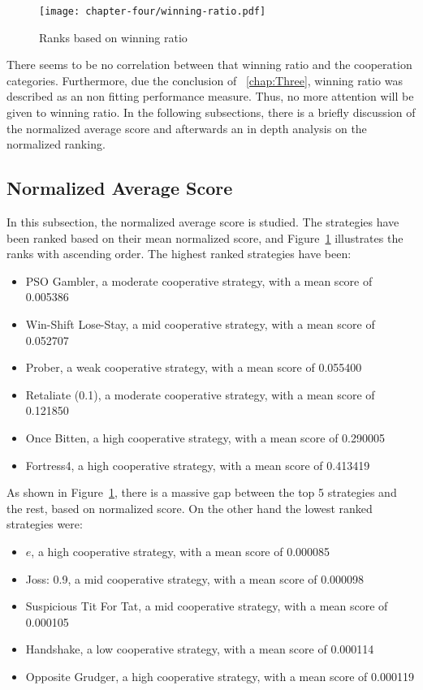 \begin{figure}[H]
	\texttt{[image: chapter-four/winning-ratio.pdf]}
	\caption{Ranks based on winning ratio}
	\label{fig:wining-second-gen}
\end{figure}

There seems to be no correlation between that winning ratio and the cooperation
categories. Furthermore, due the conclusion of ~\autoref{chap:Three}, winning ratio was described as
an non fitting performance measure. Thus, no more attention will be given to
winning ratio. In the following subsections, there is a briefly discussion of the
normalized average score and afterwards an in depth analysis on the normalized
ranking.

\subsection{Normalized Average Score}
\label{sub:chap-four-normalized-score}
In this subsection, the normalized average score is studied. The strategies
have been ranked based on their mean normalized score, and Figure~\ref{fig:wining-second-gen} illustrates
the ranks with ascending order. The highest ranked strategies have been:

\begin{itemize}
	\item PSO Gambler, a moderate cooperative strategy, with a mean score of 0.005386
	\item Win-Shift Lose-Stay, a mid cooperative strategy, with a mean score of 0.052707
	\item Prober, a weak cooperative strategy, with a mean score of 0.055400
	\item Retaliate (0.1), a moderate cooperative strategy, with a mean score of 0.121850
	\item Once Bitten, a high cooperative strategy, with a mean score of 0.290005
	\item Fortress4, a high cooperative strategy, with a mean score of 0.413419
\end{itemize}

As shown in Figure~\ref{fig:wining-second-gen}, there is a massive gap between
the top 5 strategies and the rest, based on normalized score. On the other hand
the lowest ranked strategies were:

\begin{itemize}
	\item $e$, a high cooperative strategy, with a mean score of 0.000085
	\item Joss: 0.9, a mid cooperative strategy, with a mean score of 0.000098
	\item Suspicious Tit For Tat, a mid cooperative strategy, with a mean score of 0.000105
	\item Handshake, a low cooperative strategy, with a mean score of 0.000114
	\item Opposite Grudger, a high cooperative strategy, with a mean score of 0.000119
\end{itemize}

